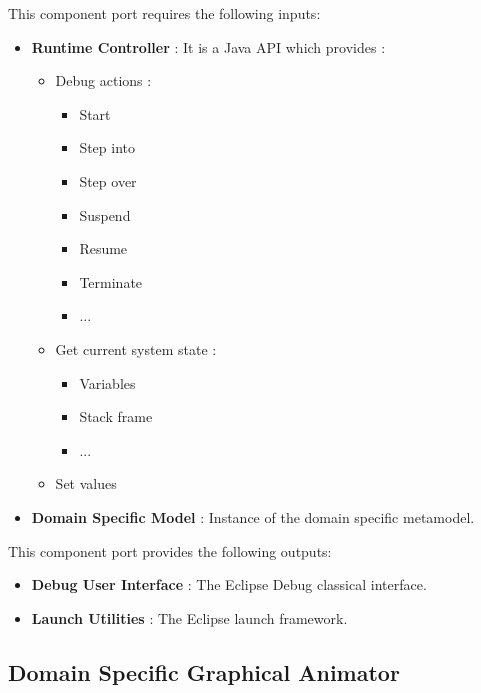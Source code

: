 \documentclass{gemoc} %
\begin{document}
This component port requires the following inputs:
\begin{itemize}
  \item \textbf{Runtime Controller} :
It is a Java API which provides :
\begin{itemize}
\item Debug actions :
\begin{itemize}
\item Start
\item Step into
\item Step over
\item Suspend
\item Resume
\item Terminate
\item ...
\end{itemize}
\item Get current system state :
\begin{itemize}
\item Variables
\item Stack frame
\item ...
\end{itemize}
\item Set values
\end{itemize}
  \item \textbf{Domain Specific Model} :
Instance of the domain specific metamodel.
\end{itemize}

This component port provides the following outputs:
\begin{itemize}
  \item \textbf{Debug User Interface} :
The Eclipse Debug classical interface.
  \item \textbf{Launch Utilities} :
The Eclipse launch framework.
\end{itemize}


\subsection{Domain Specific Graphical Animator}
\end{document}
